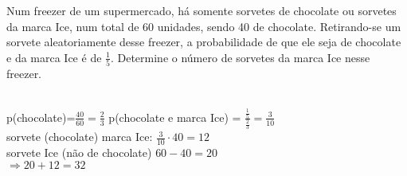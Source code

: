 \begin{ex}
Num freezer de um supermercado, há somente sorvetes de chocolate ou sorvetes da marca Ice, num total de 60 unidades, sendo 40 de chocolate. Retirando-se um sorvete aleatoriamente desse freezer, a probabilidade de que ele seja de chocolate e da marca Ice é de $\frac{1}{5}$. Determine o número de sorvetes da marca Ice nesse freezer.
 \begin{sol}
  \phantom{A} \\
  p(chocolate)=$\frac{40}{60}=\frac{2}{3}$ \hspace{0,7cm}
  p(chocolate e marca Ice) = $\frac{\frac{1}{5}}{\frac{2}{3}}=\frac{3}{10}$ \\
  sorvete (chocolate) marca Ice:  \hspace{0,6cm} $\frac{3}{10}\cdot40=12 $\\ sorvete Ice (não de chocolate)\hspace{0,6cm} $60-40=20$  \\
  $\Longrightarrow 20+12=32$
 \end{sol}
\end{ex}